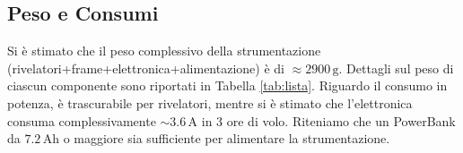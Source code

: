 \subsection{Peso e Consumi}
Si è stimato che il peso complessivo della strumentazione (rivelatori+frame+elettronica+alimentazione) è di $\approx 2900\,\text{g}$. Dettagli sul peso di ciascun componente sono riportati in Tabella \ref{tab:lista}. Riguardo il consumo in potenza, è trascurabile per rivelatori, mentre si è stimato che l'elettronica consuma complessivamente $\sim 3.6\,\text{A}$ in 3 ore di volo. Riteniamo che un PowerBank da $7.2\,\text{Ah}$ o maggiore sia sufficiente per alimentare la strumentazione.
